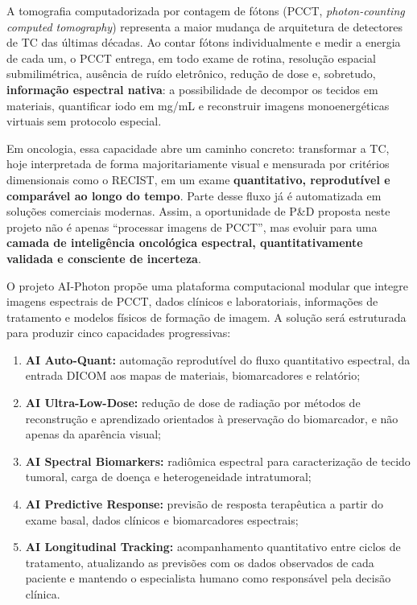 \documentclass[11pt,a4paper]{article}
\begin{document}
A tomografia computadorizada por contagem de fótons (PCCT, \emph{photon-counting computed tomography}) representa a maior mudança de arquitetura de detectores de TC das últimas décadas. Ao contar fótons individualmente e medir a energia de cada um, o PCCT entrega, em todo exame de rotina, resolução espacial submilimétrica, ausência de ruído eletrônico, redução de dose e, sobretudo, \textbf{informação espectral nativa}: a possibilidade de decompor os tecidos em materiais, quantificar iodo em mg/mL e reconstruir imagens monoenergéticas virtuais sem protocolo especial.

Em oncologia, essa capacidade abre um caminho concreto: transformar a TC, hoje interpretada de forma majoritariamente visual e mensurada por critérios dimensionais como o RECIST, em um exame \textbf{quantitativo, reprodutível e comparável ao longo do tempo}. Parte desse fluxo já é automatizada em soluções comerciais modernas. Assim, a oportunidade de P\&D proposta neste projeto não é apenas ``processar imagens de PCCT'', mas evoluir para uma \textbf{camada de inteligência oncológica espectral, quantitativamente validada e consciente de incerteza}.

O projeto AI-Photon propõe uma plataforma computacional modular que integre imagens espectrais de PCCT, dados clínicos e laboratoriais, informações de tratamento e modelos físicos de formação de imagem. A solução será estruturada para produzir cinco capacidades progressivas:

\begin{enumerate}
\item \textbf{AI Auto-Quant:} automação reprodutível do fluxo quantitativo espectral, da entrada DICOM aos mapas de materiais, biomarcadores e relatório;
\item \textbf{AI Ultra-Low-Dose:} redução de dose de radiação por métodos de reconstrução e aprendizado orientados à preservação do biomarcador, e não apenas da aparência visual;
\item \textbf{AI Spectral Biomarkers:} radiômica espectral para caracterização de tecido tumoral, carga de doença e heterogeneidade intratumoral;
\item \textbf{AI Predictive Response:} previsão de resposta terapêutica a partir do exame basal, dados clínicos e biomarcadores espectrais;
\item \textbf{AI Longitudinal Tracking:} acompanhamento quantitativo entre ciclos de tratamento, atualizando as previsões com os dados observados de cada paciente e mantendo o especialista humano como responsável pela decisão clínica.
\end{enumerate}
\end{document}
